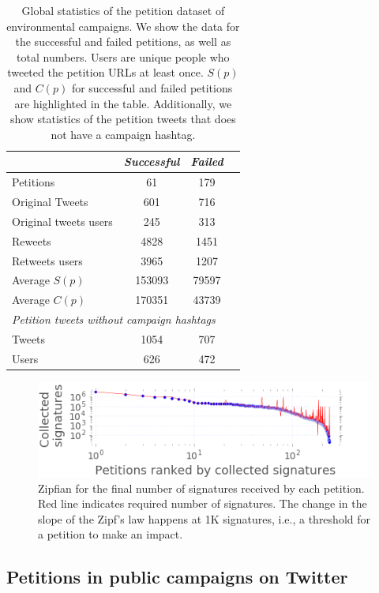 \begin{table}[hbt!]
\centering
\begin{tabular}{lccc}
			& \textit{Successful} & \textit{Failed}	\\ \midrule
Petitions					& 61		& 179		\\
Original Tweets				& 601		& 716		\\
Original tweets users 		& 245		& 313		\\
Reweets						& 4828		& 1451 		\\
Retweets users				& 3965		& 1207		\\
Average $S(p)$				& 153093	& 79597		\\
Average $C(p)$				& 170351	& 43739		\\
\multicolumn{3}{l}{\textit{Petition tweets without campaign hashtags}}	\\ \midrule
Tweets						& 1054		& 707		\\
Users 						& 626		& 472		\\
\end{tabular}
\caption{Global statistics of the petition dataset of environmental campaigns. We show the data for the successful and failed petitions, as well as total numbers. Users are unique people who tweeted the petition URLs at least once. $S(p)$ and $C(p)$ for successful and failed petitions are highlighted in the table. Additionally, we show statistics of the petition tweets that does not have a campaign hashtag.}
\label{tab:petition_tweets}
\end{table}

\begin{figure}
\centering
\includegraphics[scale=0.44]{figures/petitionsVSrank.png}
\caption{Zipfian for the final number of signatures received by each petition. Red line indicates required number of signatures. The change in the slope of the Zipf's law happens at 1K signatures, i.e., a threshold for a petition to make an impact.}
\label{fig:signatures_vs_rank}
\end{figure}

\subsection{Petitions in public campaigns on Twitter}

